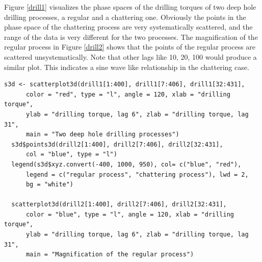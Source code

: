 Figure \ref{drill1} visualizes the phase spaces of the drilling torques of two deep hole drilling processes,
a regular and a chattering one.
Obviously the points in the phase space of the chattering process are very systematically scattered,
and the range of the data is very different for the two processes.
The magnification of the regular process in Figure \ref{drill2} shows that the points of the regular process are scattered
unsystematically.
Note that other lags like 10, 20, 100 would produce a similar plot.
This indicates a sine wave like relationship in the chattering case.

\vspace{10mm}
\small
\begin{Verbatim}[frame=single]
  s3d <- scatterplot3d(drill1[1:400], drill1[7:406], drill1[32:431],
      color = "red", type = "l", angle = 120, xlab = "drilling torque",
      ylab = "drilling torque, lag 6", zlab = "drilling torque, lag 31",
      main = "Two deep hole drilling processes")
  s3d$points3d(drill2[1:400], drill2[7:406], drill2[32:431],
      col = "blue", type = "l")
  legend(s3d$xyz.convert(-400, 1000, 950), col= c("blue", "red"),
      legend = c("regular process", "chattering process"), lwd = 2,
      bg = "white")

  scatterplot3d(drill2[1:400], drill2[7:406], drill2[32:431],
      color = "blue", type = "l", angle = 120, xlab = "drilling torque",
      ylab = "drilling torque, lag 6", zlab = "drilling torque, lag 31",
      main = "Magnification of the regular process")
\end{Verbatim}
\normalsize

